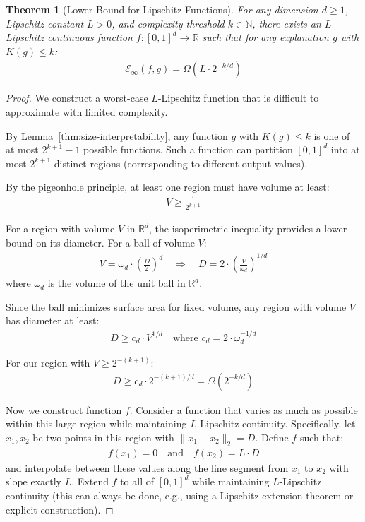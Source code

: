 \documentclass[11pt,letter,leqno]{article}
\newtheorem{theorem}{Theorem}[section]
\begin{document}
\begin{theorem}[Lower Bound for Lipschitz Functions]
\label{thm:lipschitz-lower-bound}
For any dimension $d \geq 1$, Lipschitz constant $L > 0$, and complexity threshold $k \in \mathbb{N}$, there exists an $L$-Lipschitz continuous function $f: [0,1]^d \rightarrow \mathbb{R}$ such that for any explanation $g$ with $K(g) \leq k$:
\begin{align}
\mathcal{E}_{\infty}(f, g) = \Omega\left(L \cdot 2^{-k/d}\right)
\end{align}
\end{theorem}

\begin{proof}
We construct a worst-case $L$-Lipschitz function that is difficult to approximate with limited complexity.

By Lemma~\ref{thm:size-interpretability}, any function $g$ with $K(g) \leq k$ is one of at most $2^{k+1} - 1$ possible functions. Such a function can partition $[0,1]^d$ into at most $2^{k+1}$ distinct regions (corresponding to different output values).

By the pigeonhole principle, at least one region must have volume at least:
\begin{align}
V \geq \frac{1}{2^{k+1}}
\end{align}

For a region with volume $V$ in $\mathbb{R}^d$, the isoperimetric inequality provides a lower bound on its diameter. For a ball of volume $V$:
\begin{align}
V = \omega_d \cdot \left(\frac{D}{2}\right)^d \quad \Rightarrow \quad D = 2 \cdot \left(\frac{V}{\omega_d}\right)^{1/d}
\end{align}
where $\omega_d$ is the volume of the unit ball in $\mathbb{R}^d$.

Since the ball minimizes surface area for fixed volume, any region with volume $V$ has diameter at least:
\begin{align}
D \geq c_d \cdot V^{1/d} \quad \text{where } c_d = 2 \cdot \omega_d^{-1/d}
\end{align}

For our region with $V \geq 2^{-(k+1)}$:
\begin{align}
D \geq c_d \cdot 2^{-(k+1)/d} = \Omega(2^{-k/d})
\end{align}

Now we construct function $f$. Consider a function that varies as much as possible within this large region while maintaining $L$-Lipschitz continuity. Specifically, let $x_1, x_2$ be two points in this region with $\|x_1 - x_2\|_2 = D$. Define $f$ such that:
\begin{align}
f(x_1) = 0 \quad \text{and} \quad f(x_2) = L \cdot D
\end{align}
and interpolate between these values along the line segment from $x_1$ to $x_2$ with slope exactly $L$. Extend $f$ to all of $[0,1]^d$ while maintaining $L$-Lipschitz continuity (this can always be done, e.g., using a Lipschitz extension theorem or explicit construction).


\end{proof}
\end{document}
